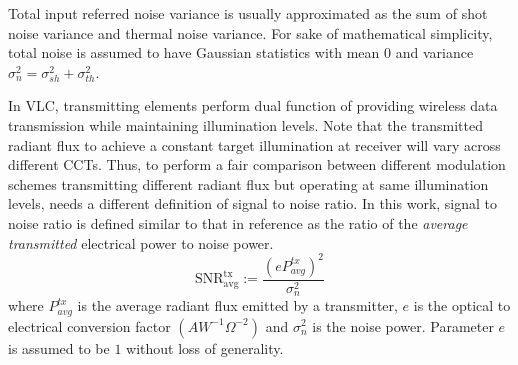 Total input referred noise variance is usually approximated as the sum of shot noise variance and thermal noise variance.  For sake of mathematical simplicity, total noise is assumed to have Gaussian statistics with mean $0$ and variance $\sigma_{n}^{2} = \sigma_{sh}^{2} + \sigma_{th}^{2}$.

In VLC, transmitting elements perform dual function of providing wireless data transmission while maintaining illumination levels. Note that the transmitted radiant flux to achieve a constant target illumination at receiver will vary across different CCTs. Thus, to perform a fair comparison between different modulation schemes transmitting different radiant flux but operating at same illumination levels, needs a different definition of signal to noise ratio. In this work, signal to noise ratio is defined similar to that in reference \cite{fat13a} as the ratio of the \textit{average transmitted} electrical power to noise power. 
\begin{equation}
	\label{eqSNR}
	\text{SNR}^{\text{tx}}_{\text{avg}} := \frac{(eP_{avg}^{tx})^2}{\sigma_n^{2}}
\end{equation}
where $P_{avg}^{tx}$ is the average radiant flux emitted by a transmitter, $e$ is the optical to electrical conversion factor $(AW^{-1}\Omega^{-2})$ and $\sigma_n^{2}$ is the noise power. Parameter $e$ is assumed to be $1$ without loss of generality.